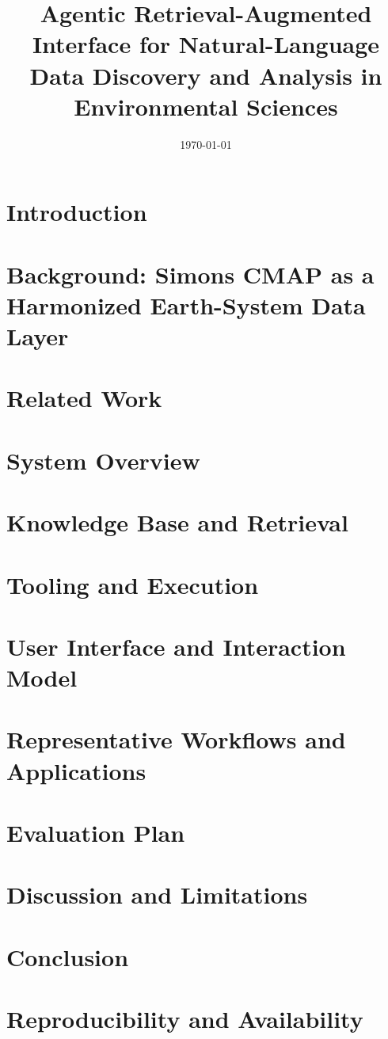 \documentclass[11pt]{article}
\title{Agentic Retrieval-Augmented Interface for Natural-Language Data Discovery and Analysis in Environmental Sciences}
\date{\today}
\begin{document}
\maketitle

\begin{abstract}

\end{abstract}

\section{Introduction}


\section{Background: Simons CMAP as a Harmonized Earth-System Data Layer}


\section{Related Work}


\section{System Overview}


\section{Knowledge Base and Retrieval}


\section{Tooling and Execution}


\section{User Interface and Interaction Model}


\section{Representative Workflows and Applications}


\section{Evaluation Plan}


\section{Discussion and Limitations}


\section{Conclusion}


\section*{Reproducibility and Availability}




\end{document}
